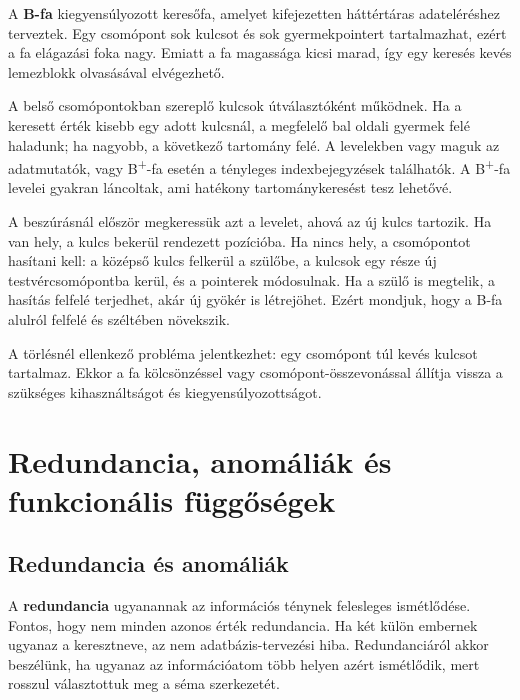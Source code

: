 A \textbf{B-fa} kiegyensúlyozott keresőfa, amelyet kifejezetten háttértáras adateléréshez terveztek. Egy csomópont sok kulcsot és sok gyermekpointert tartalmazhat, ezért a fa elágazási foka nagy. Emiatt a fa magassága kicsi marad, így egy keresés kevés lemezblokk olvasásával elvégezhető.

A belső csomópontokban szereplő kulcsok útválasztóként működnek. Ha a keresett érték kisebb egy adott kulcsnál, a megfelelő bal oldali gyermek felé haladunk; ha nagyobb, a következő tartomány felé. A levelekben vagy maguk az adatmutatók, vagy B\textsuperscript{+}-fa esetén a tényleges indexbejegyzések találhatók. A B\textsuperscript{+}-fa levelei gyakran láncoltak, ami hatékony tartománykeresést tesz lehetővé.



\begin{center}

\end{center}


A beszúrásnál először megkeressük azt a levelet, ahová az új kulcs tartozik. Ha van hely, a kulcs bekerül rendezett pozícióba. Ha nincs hely, a csomópontot hasítani kell: a középső kulcs felkerül a szülőbe, a kulcsok egy része új testvércsomópontba kerül, és a pointerek módosulnak. Ha a szülő is megtelik, a hasítás felfelé terjedhet, akár új gyökér is létrejöhet. Ezért mondjuk, hogy a B-fa alulról felfelé és széltében növekszik.

A törlésnél ellenkező probléma jelentkezhet: egy csomópont túl kevés kulcsot tartalmaz. Ekkor a fa kölcsönzéssel vagy csomópont-összevonással állítja vissza a szükséges kihasználtságot és kiegyensúlyozottságot.

\section{Redundancia, anomáliák és funkcionális függőségek}

\subsection{Redundancia és anomáliák}

A \textbf{redundancia} ugyanannak az információs ténynek felesleges ismétlődése. Fontos, hogy nem minden azonos érték redundancia. Ha két külön embernek ugyanaz a keresztneve, az nem adatbázis-tervezési hiba. Redundanciáról akkor beszélünk, ha ugyanaz az információatom több helyen azért ismétlődik, mert rosszul választottuk meg a séma szerkezetét.

